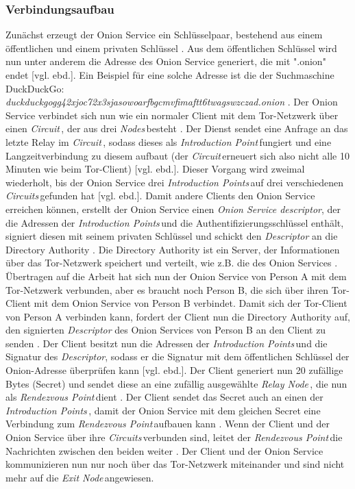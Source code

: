 \documentclass[a4paper,ngerman, headheight=28pt,12pt]{scrartcl}
\newcommand{\vcite}[1]{\cite[vgl.][]{#1}}
\newcommand{\vebd}{[vgl. ebd.]}
\newcommand{\relayn}{\textit{Relay Node\,}}
\newcommand{\exitn}{\textit{Exit Node\,}}
\newcommand{\nodes}{\textit{Nodes\,}}
\newcommand{\circuit}{\textit{Circuit\,}}
\newcommand{\circuits}{\textit{Circuits\,}}
\newcommand{\introp}{\textit{Introduction Point\,}}
\newcommand{\introps}{\textit{Introduction Points\,}}
\newcommand{\renp}{\textit{Rendezvous Point\,}}
\begin{document}
\subsubsection{Verbindungsaufbau}
Zunächst erzeugt der Onion Service ein Schlüsselpaar, bestehend aus einem öffentlichen und einem privaten Schlüssel \vcite{GeeksOnionService}. Aus dem öffentlichen Schlüssel wird nun unter anderem die Adresse des Onion Service generiert, die mit ".onion" endet \vebd. Ein Beispiel für eine solche Adresse ist die der Suchmaschine DuckDuckGo: \\
\textit{duckduckgogg42xjoc72x3sjasowoarfbgcmvfimaftt6twagswzczad.onion} \vcite{DuckDuckGoLink}.
Der Onion Service verbindet sich nun wie ein normaler Client mit dem Tor-Netzwerk über einen \circuit, der aus drei \nodes besteht \vcite{TorOnionService}. Der Dienst sendet eine Anfrage an das letzte Relay im \circuit, sodass dieses als \introp fungiert und eine Langzeitverbindung zu diesem aufbaut (der \circuit erneuert sich also nicht alle 10 Minuten wie beim Tor-Client) \vebd. Dieser Vorgang wird zweimal wiederholt, bis der Onion Service drei \introps auf drei verschiedenen \circuits gefunden hat \vebd. Damit andere Clients den Onion Service erreichen können, erstellt der Onion Service einen \textit{Onion Service descriptor}, der die Adressen der \introps und die Authentifizierungsschlüssel enthält, signiert diesen mit seinem privaten Schlüssel und schickt den \textit{Descriptor} an die Directory Authority \vcite{TorSpecDerivingKeys, TorSpecDirectoryInf}. Die Directory Authority ist ein Server, der Informationen über das Tor-Netzwerk speichert und verteilt, wie z.B. die des Onion Services \vcite{TorDirectoryAuthority}. Übertragen auf die Arbeit hat sich nun der Onion Service von Person A mit dem Tor-Netzwerk verbunden, aber es braucht noch Person B, die sich über ihren Tor-Client mit dem Onion Service von Person B verbindet. Damit sich der Tor-Client von Person A verbinden kann, fordert der Client nun die Directory Authority auf, den signierten \textit{Descriptor} des Onion Services von Person B an den Client zu senden \vcite{TorStructure}. Der Client besitzt nun die Adressen der \introps und die Signatur des \textit{Descriptor}, sodass er die Signatur mit dem öffentlichen Schlüssel der Onion-Adresse überprüfen kann \vebd. Der Client generiert nun 20 zufällige Bytes (Secret) und sendet diese an eine zufällig ausgewählte \relayn, die nun als \renp dient \vcite{TorSpecRendezvous}. Der Client sendet das Secret auch an einen der \introps, damit der Onion Service mit dem gleichen Secret eine Verbindung zum \renp aufbauen kann \vcite{TorSpecIntroP}. Wenn der Client und der Onion Service über ihre \circuits verbunden sind, leitet der \renp die Nachrichten zwischen den beiden weiter \vcite{TorSpecRendezvous}. Der Client und der Onion Service kommunizieren nun nur noch über das Tor-Netzwerk miteinander und sind nicht mehr auf die \exitn angewiesen.
\end{document}
